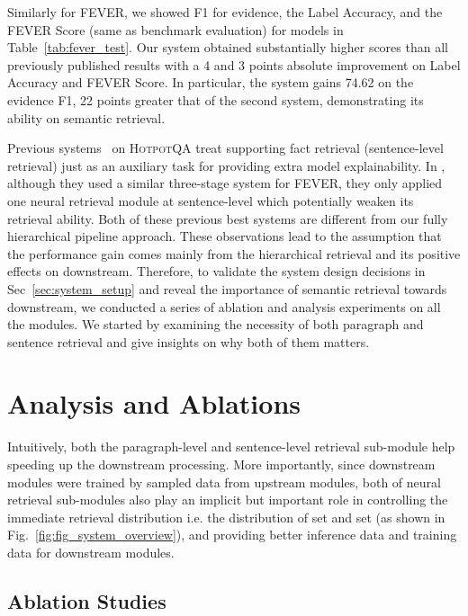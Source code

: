 \documentclass[11pt,a4paper]{article}
\newcommand\fever{FEVER\xspace}
\newcommand\hpqa{\textsc{HotpotQA}\xspace}
\begin{document}
Similarly for \fever, we showed F1 for evidence, the Label Accuracy, and the FEVER Score (same as benchmark evaluation) for models in Table~\ref{tab:fever_test}. Our system obtained substantially higher scores than all previously published results with a 4 and 3 points absolute improvement on Label Accuracy and \fever  Score. In particular, the system gains 74.62 on the evidence F1, 22 points greater that of the second system, demonstrating its ability on semantic retrieval.

Previous systems~\cite{ding2019coggraph,yang2018hotpotqa} on \hpqa treat supporting fact retrieval (sentence-level retrieval) just as an auxiliary task for providing extra model explainability. In , although they used a similar three-stage system for \fever, they only applied one neural retrieval module at sentence-level which potentially weaken its retrieval ability. Both of these previous best systems are different from our fully hierarchical pipeline approach. These observations lead to the assumption that the performance gain comes mainly from the hierarchical retrieval and its positive effects on downstream. Therefore, to validate the system design decisions in Sec~\ref{sec:system_setup} and reveal the importance of semantic retrieval towards downstream, we conducted a series of ablation and analysis experiments on all the modules. We started by examining the necessity of both paragraph and sentence retrieval and give insights on why both of them matters.


\section{Analysis and Ablations}
\label{sec:analysis}
Intuitively, both the paragraph-level and sentence-level retrieval sub-module help speeding up the downstream processing. More importantly, since downstream modules were trained by sampled data from upstream modules, both of neural retrieval sub-modules also play an implicit but important role in controlling the immediate retrieval distribution i.e. the distribution of set  and set  (as shown in Fig.~\ref{fig:fig_system_overview}), and providing better inference data and training data for downstream modules.


\subsection{Ablation Studies} 
\end{document}
